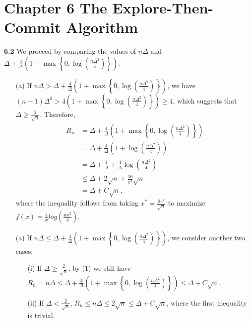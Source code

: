 \chapter*{Chapter 6 The Explore-Then-Commit Algorithm}
\label{sec:6}

\noindent\textbf{6.2}
We proceed by comparing the values of $n\Delta$ and $\Delta+\frac{4}{\Delta}\left(1+\max \left\{0, \log \left(\frac{n \Delta^{2}}{4}\right)\right\}\right)$.

\begin{enumerate}
    \item[(a)] If $n\Delta > \Delta+\frac{4}{\Delta}\left(1+\max \left\{0, \log \left(\frac{n \Delta^{2}}{4}\right)\right\}\right)$,
    we have $(n - 1) \Delta^2 > 4 (1 + \max \left\{0, \log \left(\frac{n \Delta^{2}}{4}\right)\right\}) \geq 4$,
    which suggests that $\Delta \geq \frac{2}{\sqrt{n}}$.
    Therefore, \begin{equation*}
        \begin{aligned}
            R_n
            &=\Delta+\frac{4}{\Delta}\left(1+\max \left\{0, \log \left(\frac{n \Delta^{2}}{4}\right)\right\}\right)\\
            &= \Delta+\frac{4}{\Delta}\left(1+\log \left(\frac{n \Delta^{2}}{4}\right)\right)\\
            &= \Delta+\frac{4}{\Delta}+\frac{4}{\Delta}\log(\frac{n\Delta^2}{4})\\
            &\leq \Delta+2\sqrt{n}+\frac{16}{e^4}\sqrt{n}\\
            &=\Delta + C\sqrt{n},
        \end{aligned}
    \end{equation*}
    where the inequality follows from taking $x^* = \frac{2e^4}{\sqrt{n}}$ to maximize $f(x) = \frac{4}{x} log(\frac{nx^2}{4})$.

    \item[(a)] If $n\Delta \leq \Delta+\frac{4}{\Delta}\left(1+\max \left\{0, \log \left(\frac{n \Delta^{2}}{4}\right)\right\}\right)$,
    we consider another two cases:

    \begin{enumerate}
        \item[(i)] If $\Delta \geq \frac{2}{\sqrt{n}}$, by (1) we still have $R_n = n\Delta \leq \Delta+\frac{4}{\Delta}\left(1+\max \left\{0, \log \left(\frac{n \Delta^{2}}{4}\right)\right\}\right) \leq \Delta + C\sqrt{n}$.
        \item[(ii)] If $\Delta < \frac{2}{\sqrt{n}}$, $R_n \leq n\Delta \leq 2\sqrt{n} \leq \Delta + C\sqrt{n}$, where the first inequality is trivial.
    \end{enumerate}
\end{enumerate}

